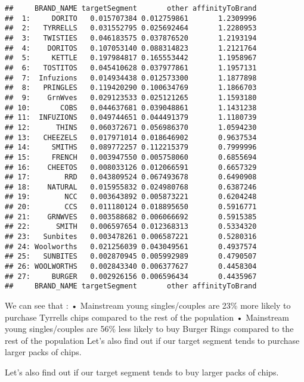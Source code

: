 \documentclass[
]{article}
\begin{document}
\begin{verbatim}
##     BRAND_NAME targetSegment       other affinityToBrand
##  1:     DORITO   0.015707384 0.012759861       1.2309996
##  2:   TYRRELLS   0.031552795 0.025692464       1.2280953
##  3:   TWISTIES   0.046183575 0.037876520       1.2193194
##  4:    DORITOS   0.107053140 0.088314823       1.2121764
##  5:     KETTLE   0.197984817 0.165553442       1.1958967
##  6:   TOSTITOS   0.045410628 0.037977861       1.1957131
##  7:  Infuzions   0.014934438 0.012573300       1.1877898
##  8:   PRINGLES   0.119420290 0.100634769       1.1866703
##  9:    GrnWves   0.029123533 0.025121265       1.1593180
## 10:       COBS   0.044637681 0.039048861       1.1431238
## 11:  INFUZIONS   0.049744651 0.044491379       1.1180739
## 12:      THINS   0.060372671 0.056986370       1.0594230
## 13:   CHEEZELS   0.017971014 0.018646902       0.9637534
## 14:     SMITHS   0.089772257 0.112215379       0.7999996
## 15:     FRENCH   0.003947550 0.005758060       0.6855694
## 16:    CHEETOS   0.008033126 0.012066591       0.6657329
## 17:        RRD   0.043809524 0.067493678       0.6490908
## 18:    NATURAL   0.015955832 0.024980768       0.6387246
## 19:        NCC   0.003643892 0.005873221       0.6204248
## 20:        CCS   0.011180124 0.018895650       0.5916771
## 21:    GRNWVES   0.003588682 0.006066692       0.5915385
## 22:      SMITH   0.006597654 0.012368313       0.5334320
## 23:   Sunbites   0.003478261 0.006587221       0.5280316
## 24: Woolworths   0.021256039 0.043049561       0.4937574
## 25:   SUNBITES   0.002870945 0.005992989       0.4790507
## 26: WOOLWORTHS   0.002843340 0.006377627       0.4458304
## 27:     BURGER   0.002926156 0.006596434       0.4435967
##     BRAND_NAME targetSegment       other affinityToBrand
\end{verbatim}

We can see that : • Mainstream young singles/couples are 23\% more
likely to purchase Tyrrells chips compared to the rest of the population
• Mainstream young singles/couples are 56\% less likely to buy Burger
Rings compared to the rest of the population Let's also find out if our
target segment tends to purchase larger packs of chips.

Let's also find out if our target segment tends to buy larger packs of
chips.
\end{document}
